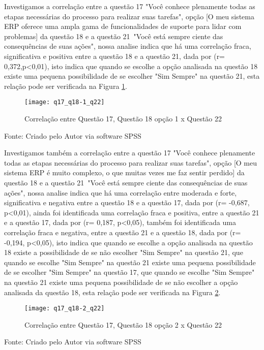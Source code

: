 Investigamos a correlação entre a questão 17 "Você conhece plenamente todas as etapas necessárias do processo para realizar suas tarefas", opção [O meu sistema ERP oferece uma ampla gama de funcionalidades de suporte para lidar com problemas] da questão 18 e a questão 21 "Você está sempre ciente das consequências de suas ações", nossa analise indica que há uma correlação fraca, significativa e positiva entre a questão 18 e a questão 21, dada por (r= 0,372,p<0,01), isto indica que quando se escolhe a opção analisada na questão 18 existe uma pequena possibilidade de se escolher "Sim Sempre" na questão 21, esta relação pode ser verificada na Figura \ref{fig:figura-q17_q18-1_q22}.\newline

\begin{figure}[H]
	\centering	
	\caption{Correlação entre Questão 17, Questão 18 opção 1 x Questão 22}
	\texttt{[image: q17\_q18-1\_q22]}
	\label{fig:figura-q17_q18-1_q22}
\end{figure}
\vspace{-0.8 cm} \hspace{0.45 cm} Fonte: Criado pelo Autor via software SPSS\newline

Investigamos também a correlação entre a questão 17 "Você conhece plenamente todas as etapas necessárias do processo para realizar suas tarefas", opção [O meu sistema ERP é muito complexo, o que muitas vezes me faz sentir perdido] da questão 18 e a questão 21 "Você está sempre ciente das consequências de suas ações", nossa analise indica que há uma correlação entre moderada e forte, significativa e negativa entre a questão 18 e a questão 17, dada por (r= -0,687, p<0,01), ainda foi identificada uma correlação fraca e positiva, entre a questão 21 e a questão 17, dada por (r= 0,187, p<0,05), também foi identificada uma correlação fraca e negativa, entre a questão 21 e a questão 18, dada por (r= -0,194, p<0,05), isto indica que quando se escolhe a opção analisada na questão 18 existe a possibilidade de se não escolher "Sim Sempre" na questão 21, que quando se escolhe "Sim Sempre" na questão 21 existe uma pequena possibilidade de se escolher "Sim Sempre" na questão 17, que quando se escolhe "Sim Sempre" na questão 21 existe uma pequena possibilidade de se não escolher a opção analisada da questão 18, esta relação pode ser verificada na Figura  \ref{fig:figura-q17_q18-2_q22}.\newline

\begin{figure}[H]
	\centering	
	\caption{Correlação entre Questão 17, Questão 18 opção 2 x Questão 22}
	\texttt{[image: q17\_q18-2\_q22]}
	\label{fig:figura-q17_q18-2_q22}
\end{figure}
\vspace{-0.8 cm} \hspace{0.45 cm} Fonte: Criado pelo Autor via software SPSS\newline

